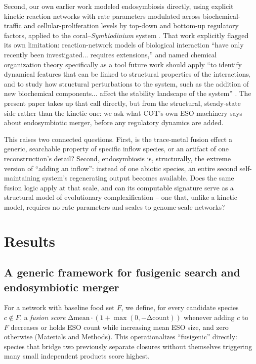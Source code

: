 \documentclass[9pt,twocolumn,twoside]{pnas-new}
\begin{document}
Second, our own earlier work modeled endosymbiosis directly, using explicit kinetic reaction networks with rate parameters modulated across biochemical-traffic and cellular-proliferation levels by top-down and bottom-up regulatory factors, applied to the coral--\textit{Symbiodinium} system \cite{velozflores2020soft,velozflores2021}. That work explicitly flagged its own limitation: reaction-network models of biological interaction ``have only recently been investigated... requires extensions,'' and named chemical organization theory specifically as a tool future work should apply ``to identify dynamical features that can be linked to structural properties of the interactions, and to study how structural perturbations to the system, such as the addition of new biochemical components... affect the stability landscape of the system'' \cite{velozflores2021}. The present paper takes up that call directly, but from the structural, steady-state side rather than the kinetic one: we ask what COT's own ESO machinery says about endosymbiotic merger, before any regulatory dynamics are added.

This raises two connected questions. First, is the trace-metal fusion effect a generic, searchable property of specific inflow species, or an artifact of one reconstruction's detail? Second, endosymbiosis is, structurally, the extreme version of ``adding an inflow'': instead of one abiotic species, an entire second self-maintaining system's regenerating output becomes available. Does the same fusion logic apply at that scale, and can its computable signature serve as a structural model of evolutionary complexification -- one that, unlike a kinetic model, requires no rate parameters and scales to genome-scale networks?

\section*{Results}

\subsection*{A generic framework for fusigenic search and endosymbiotic merger}
For a network with baseline food set $F$, we define, for every candidate species $c \notin F$, a \emph{fusion score} $\mathrm{\Delta mean} \cdot (1 + \max(0,-\mathrm{\Delta count}))$ whenever adding $c$ to $F$ decreases or holds ESO count while increasing mean ESO size, and zero otherwise (Materials and Methods). This operationalizes ``fusigenic'' directly: species that bridge two previously separate closures without themselves triggering many small independent products score highest.
\end{document}
